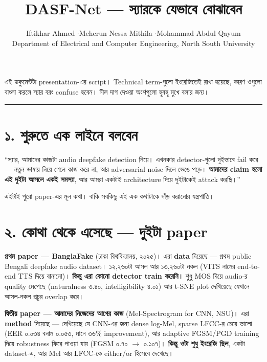 \documentclass[11pt,a4paper]{article}
\title{\textbf{DASF-Net --- স্যারকে যেভাবে বোঝাবেন}}
\author{Iftikhar Ahmed \quad$\cdot$\quad Meherun Nessa Mithila \quad$\cdot$\quad Mohammad Abdul Qayum\\
Department of Electrical and Computer Engineering, North South University}
\date{}
\newenvironment{say}{%
  \def\FrameCommand{\textcolor{barcol}{\vrule width 3pt}\hspace{8pt}}%
  \MakeFramed{\advance\hsize-\width \FrameRestore}%
}{\endMakeFramed}
\begin{document}
\maketitle

\noindent
\small
এই ডকুমেন্টটা presentation-এর script। Technical term-গুলো ইংরেজিতেই রাখা হয়েছে,
কারণ ওগুলো বাংলা করলে স্যার বরং confuse হবেন। নীল দাগ দেওয়া অংশগুলো
হুবহু মুখে বলার জন্য।
\normalsize

\vspace{4pt}
\hrule
\vspace{10pt}

\section*{১. শুরুতে এক লাইনে বলবেন}

\begin{say}
``স্যার, আমাদের কাজটা audio deepfake detection নিয়ে। এখনকার detector-গুলো
দুইভাবে fail করে --- নতুন ভাষায় নিয়ে গেলে কাজ করে না, আর adversarial noise
দিলে ভেঙে পড়ে। \textbf{আমাদের claim হলো এই দুইটা আসলে একই সমস্যা}, আর আমরা
একটাই architecture দিয়ে দুইটাকেই attack করছি।''
\end{say}

এইটাই পুরো paper-এর মূল কথা। বাকি সবকিছু এই এক কথাটাকে দাঁড় করানোর যন্ত্রপাতি।

\section*{২. কোথা থেকে এসেছে --- দুইটা paper}

\textbf{প্রথম paper --- BanglaFake} (ঢাকা বিশ্ববিদ্যালয়, ২০২৫)।
এরা \textbf{data} দিয়েছে --- প্রথম public Bengali deepfake audio dataset।
১২,২৬০টা আসল আর ১৩,২৬০টা নকল (VITS নামের end-to-end TTS দিয়ে বানানো)।
\textbf{কিন্তু এরা কোনো detector train করেনি।} শুধু MOS দিয়ে audio-র quality
মেপেছে (naturalness ৩.৪০, intelligibility ৪.০১) আর t-SNE plot দেখিয়েছে যেখানে
আসল-নকল প্রচুর overlap করে।

\textbf{দ্বিতীয় paper --- আমাদের নিজেদের আগের কাজ} (Mel-Spectrogram for CNN, NSU)।
এরা \textbf{method} দিয়েছে --- দেখিয়েছে যে CNN-এর জন্য dense log-Mel, sparse
LFCC-র চেয়ে ভালো (EER ০.০৩৪ বনাম ০.০৫৩, মানে ৩৬\% improvement), আর adaptive
FGSM/PGD training দিয়ে robustness ফিরে পাওয়া যায় (FGSM ০.৭০ $\rightarrow$ ০.১০৭)।
\textbf{কিন্তু ওটা শুধু ইংরেজি ছিল}, একটা dataset-এ, আর Mel আর LFCC-কে
either/or হিসেবে দেখেছে।
\end{document}
